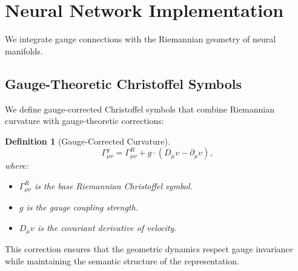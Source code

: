 \documentclass[12pt,letterpaper,twoside]{article}
\newtheorem{definition}{Definition}[section]
\begin{document}
\section{Neural Network Implementation}

We integrate gauge connections with the Riemannian geometry of neural manifolds.

\subsection{Gauge-Theoretic Christoffel Symbols}

We define gauge-corrected Christoffel symbols that combine Riemannian curvature with gauge-theoretic corrections:

\begin{definition}[Gauge-Corrected Curvature]
\[
\Gamma^g_{\mu\nu} = \Gamma^R_{\mu\nu} + g \cdot (D_\mu v - \partial_\mu v),
\]
where:
\begin{itemize}
\item $\Gamma^R_{\mu\nu}$ is the base Riemannian Christoffel symbol.
\item $g$ is the gauge coupling strength.
\item $D_\mu v$ is the covariant derivative of velocity.
\end{itemize}
\end{definition}

This correction ensures that the geometric dynamics respect gauge invariance while maintaining the semantic structure of the representation.
\end{document}
